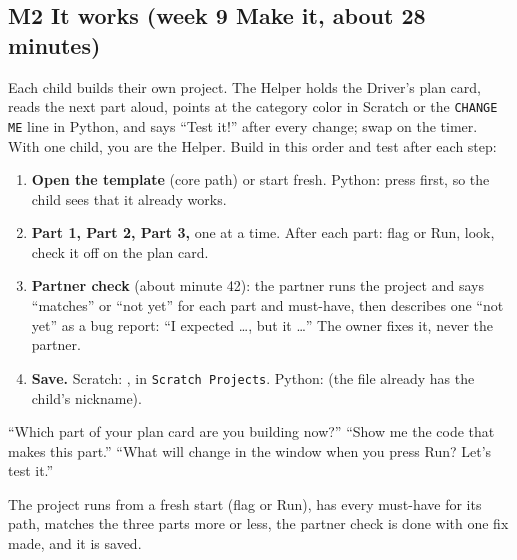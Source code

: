 \documentclass[track=junior,level=3,teacher]{kidscode}
\begin{document}
\subsection{M2 It works (week 9 Make it, about 28 minutes)}
Each child builds their own project. The Helper holds the Driver's plan card, reads the next part
aloud, points at the category color in Scratch or the \texttt{CHANGE ME} line in Python, and says
\enquote{Test it!} after every change; swap on the timer. With one child, you are the Helper. Build in
this order and test after each step:
\begin{enumerate}[itemsep=2pt]
  \item \textbf{Open the template} (core path) or start fresh. Python: press  first, so the child
        sees that it already works.
  \item \textbf{Part 1, Part 2, Part 3,} one at a time. After each part: flag or Run, look, check it off on
        the plan card.
  \item \textbf{Partner check} (about minute 42): the partner runs the project and says \enquote{matches} or
        \enquote{not yet} for each part and must-have, then describes one \enquote{not yet} as a bug report:
        \enquote{I expected \dots, but it \dots} The owner fixes it, never the partner.
  \item \textbf{Save.} Scratch: , in \texttt{Scratch Projects}. Python:
         (the file already has the child's nickname).
\end{enumerate}
\begin{teacherscript}
\enquote{Which part of your plan card are you building now?} \enquote{Show me the code that makes this
part.} \enquote{What will change in the window when you press Run? Let's test it.}
\end{teacherscript}
\begin{formativecheck}
The project runs from a fresh start (flag or Run), has every must-have for its path, matches the three
parts more or less, the partner check is done with one fix made, and it is saved.
\end{formativecheck}
\end{document}
